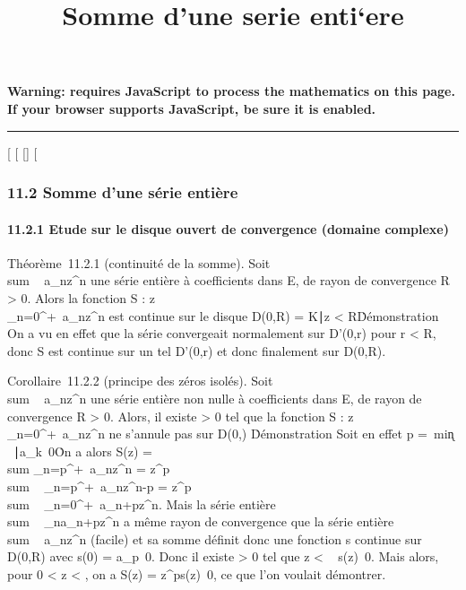 \documentclass[]{article}
\title{Somme d'une serie enti`ere}
\author{}
\date{}
\begin{document}
\maketitle

\textbf{Warning: 
requires JavaScript to process the mathematics on this page.\\ If your
browser supports JavaScript, be sure it is enabled.}

\begin{center}\rule{3in}{0.4pt}\end{center}

[
[
[]
[

\subsubsection{11.2 Somme d'une série entière}

\paragraph{11.2.1 Etude sur le disque ouvert de convergence (domaine
complexe)}

Théorème~11.2.1 (continuité de la somme). Soit
\\sum ~
a_nz^n une série entière à coefficients dans E, de
rayon de convergence R > 0. Alors la fonction S :
z\mapsto~\\\sum
 _n=0^+\infty~a_nz^n est continue sur le
disque D(0,R) = \z \in
K∣z <
R\.

Démonstration On a vu en effet que la série convergeait normalement sur
D'(0,r) pour r < R, donc S est continue sur un tel D'(0,r) et
donc finalement sur D(0,R).

Corollaire~11.2.2 (principe des zéros isolés). Soit
\\sum ~
a_nz^n une série entière non nulle à coefficients
dans E, de rayon de convergence R > 0. Alors, il existe \eta
> 0 tel que la fonction S :
z\mapsto~\\\sum
 _n=0^+\infty~a_nz^n ne s'annule pas sur
D(0,\eta) \diagdown\0\.

Démonstration Soit en effet p =\
min\k \in
{}~∣a_k\mathrel\neq~0\.
On a alors S(z) =\ \\sum
 _n=p^+\infty~a_nz^n =
z^p \\sum ~
_n=p^+\infty~a_nz^n-p =
z^p \\sum ~
_n=0^+\infty~a_n+pz^n. Mais la série entière
\\sum ~
_na_n+pz^n a même rayon de convergence que la
série entière \\sum ~
a_nz^n (facile) et sa somme définit donc une
fonction s continue sur D(0,R) avec s(0) =
a_p\neq~0. Donc il existe \eta
> 0 tel que z < \eta \rigtharrow~
s(z)\neq~0. Mais alors, pour 0 <
z < \eta, on a S(z) =
z^ps(z)\neq~0, ce que l'on voulait
démontrer.
\end{document}
